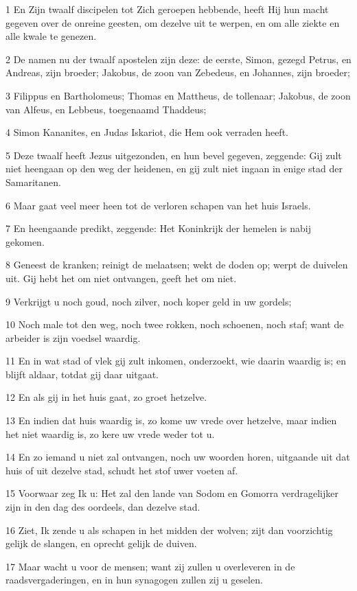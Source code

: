 \par 1 En Zijn twaalf discipelen tot Zich geroepen hebbende, heeft Hij hun macht gegeven over de onreine geesten, om dezelve uit te werpen, en om alle ziekte en alle kwale te genezen.
\par 2 De namen nu der twaalf apostelen zijn deze: de eerste, Simon, gezegd Petrus, en Andreas, zijn broeder; Jakobus, de zoon van Zebedeus, en Johannes, zijn broeder;
\par 3 Filippus en Bartholomeus; Thomas en Mattheus, de tollenaar; Jakobus, de zoon van Alfeus, en Lebbeus, toegenaamd Thaddeus;
\par 4 Simon Kananites, en Judas Iskariot, die Hem ook verraden heeft.
\par 5 Deze twaalf heeft Jezus uitgezonden, en hun bevel gegeven, zeggende: Gij zult niet heengaan op den weg der heidenen, en gij zult niet ingaan in enige stad der Samaritanen.
\par 6 Maar gaat veel meer heen tot de verloren schapen van het huis Israels.
\par 7 En heengaande predikt, zeggende: Het Koninkrijk der hemelen is nabij gekomen.
\par 8 Geneest de kranken; reinigt de melaatsen; wekt de doden op; werpt de duivelen uit. Gij hebt het om niet ontvangen, geeft het om niet.
\par 9 Verkrijgt u noch goud, noch zilver, noch koper geld in uw gordels;
\par 10 Noch male tot den weg, noch twee rokken, noch schoenen, noch staf; want de arbeider is zijn voedsel waardig.
\par 11 En in wat stad of vlek gij zult inkomen, onderzoekt, wie daarin waardig is; en blijft aldaar, totdat gij daar uitgaat.
\par 12 En als gij in het huis gaat, zo groet hetzelve.
\par 13 En indien dat huis waardig is, zo kome uw vrede over hetzelve, maar indien het niet waardig is, zo kere uw vrede weder tot u.
\par 14 En zo iemand u niet zal ontvangen, noch uw woorden horen, uitgaande uit dat huis of uit dezelve stad, schudt het stof uwer voeten af.
\par 15 Voorwaar zeg Ik u: Het zal den lande van Sodom en Gomorra verdragelijker zijn in den dag des oordeels, dan dezelve stad.
\par 16 Ziet, Ik zende u als schapen in het midden der wolven; zijt dan voorzichtig gelijk de slangen, en oprecht gelijk de duiven.
\par 17 Maar wacht u voor de mensen; want zij zullen u overleveren in de raadsvergaderingen, en in hun synagogen zullen zij u geselen.

